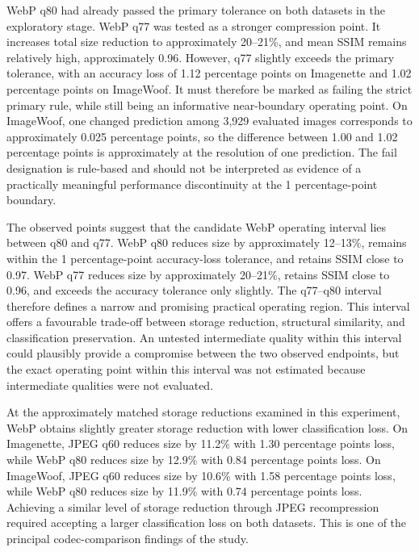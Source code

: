 WebP q80 had already passed the primary tolerance on both datasets in the exploratory stage. WebP q77 was tested as a stronger compression point. It increases total size reduction to approximately 20--21\%, and mean SSIM remains relatively high, approximately 0.96. However, q77 slightly exceeds the primary tolerance, with an accuracy loss of 1.12 percentage points on Imagenette and 1.02 percentage points on ImageWoof. It must therefore be marked as failing the strict primary rule, while still being an informative near-boundary operating point. On ImageWoof, one changed prediction among 3,929 evaluated images corresponds to approximately 0.025 percentage points, so the difference between 1.00 and 1.02 percentage points is approximately at the resolution of one prediction. The fail designation is rule-based and should not be interpreted as evidence of a practically meaningful performance discontinuity at the 1 percentage-point boundary.

The observed points suggest that the candidate WebP operating interval lies between q80 and q77. WebP q80 reduces size by approximately 12--13\%, remains within the 1 percentage-point accuracy-loss tolerance, and retains SSIM close to 0.97. WebP q77 reduces size by approximately 20--21\%, retains SSIM close to 0.96, and exceeds the accuracy tolerance only slightly. The q77--q80 interval therefore defines a narrow and promising practical operating region. This interval offers a favourable trade-off between storage reduction, structural similarity, and classification preservation. An untested intermediate quality within this interval could plausibly provide a compromise between the two observed endpoints, but the exact operating point within this interval was not estimated because intermediate qualities were not evaluated.

\FloatBarrier

At the approximately matched storage reductions examined in this experiment, WebP obtains slightly greater storage reduction with lower classification loss. On Imagenette, JPEG q60 reduces size by 11.2\% with 1.30 percentage points loss, while WebP q80 reduces size by 12.9\% with 0.84 percentage points loss. On ImageWoof, JPEG q60 reduces size by 10.6\% with 1.58 percentage points loss, while WebP q80 reduces size by 11.9\% with 0.74 percentage points loss. Achieving a similar level of storage reduction through JPEG recompression required accepting a larger classification loss on both datasets. This is one of the principal codec-comparison findings of the study.
